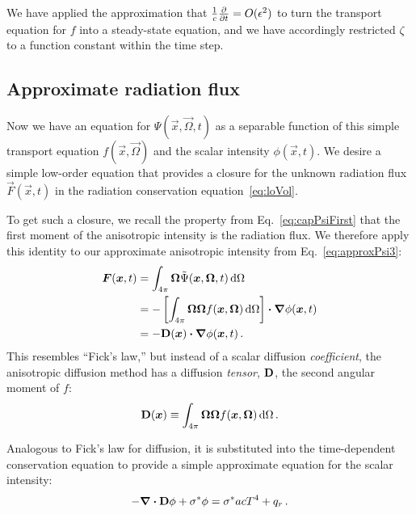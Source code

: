 We have applied the approximation that $\frac{1}{c}\frac{\partial }{\partial t}= O(\epsilon^2)$
to turn the transport equation for $f$ into a steady-state equation, and we have
accordingly restricted $\zeta$ to a function constant within the time step.

\subsection{Approximate radiation flux}
Now we have an equation for $\Psi(\vec{x}, \vec{\Omega}, t)$ as a
separable
function of this simple transport equation $f(\vec{x}, \vec{\Omega})$ and the
scalar intensity $\phi(\vec{x},t)$.
We desire a simple low-order equation that provides a closure for the unknown
radiation flux $\vec{F}(\vec{x},t)$ in the radiation conservation
equation~\eqref{eq:loVol}.

To get such a closure, we recall the property from Eq.~\eqref{eq:capPsiFirst}
that the first moment of the anisotropic intensity is the radiation flux. We
therefore apply this identity to our approximate anisotropic intensity from
Eq.~\eqref{eq:approxPsi3}:
\begin{align} \nonumber
  \bm{F}(\bm{x}, t)
  &= \int_{4\pi} \bm{\Omega} \tilde \Psi(\bm{x}, \bm{\Omega}, t) \mathop{}\!\mathrm{d}\Omega
  \\ \nonumber
  &= 
  - \left[ \int_{4\pi} \bm{\Omega} \bm{\Omega} f(\bm{x}, \bm{\Omega})
  \mathop{}\!\mathrm{d}\Omega \right]
  \bm{\cdot} \bm{\nabla} \phi(\bm{x},t)
  \\ \label{eq:anisotropicFicks}
  &= - \mathbf{D}(\bm{x}) \bm{\cdot} \bm{\nabla} \phi(\bm{x},t) \,.
\end{align}
This resembles ``Fick's law,'' but instead of a scalar diffusion \emph{coefficient},
the anisotropic diffusion method has a diffusion \emph{tensor}, $\mathbf{D}$, the
second angular moment of $f$:
\begin{equation}\label{eq:dDefinition}
  \mathbf{D}(\bm{x}) \equiv \int_{4\pi} \bm{\Omega} \bm{\Omega}
  f(\bm{x}, \bm{\Omega}) \mathop{}\!\mathrm{d}\Omega \,.
\end{equation}

Analogous to Fick's law for diffusion, it is
substituted into the time-dependent conservation equation to provide a simple
approximate equation for the scalar intensity:
\begin{equation*}
  -\bm{\nabla} \bm{\cdot} \mathbf{D} \phi + \sigma^\ast \phi = \sigma^\ast ac T^4 + q_{r} \,.
\end{equation*}

